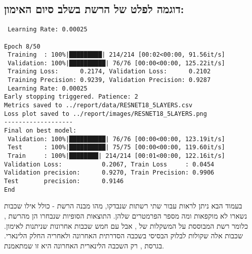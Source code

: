 \HE 
\subsection*{דוגמה לפלט של הרשת בשלב סיום האימון:}
\EN
\begin{tcolorbox}[colframe=black, colback=gray!5, boxrule=0.5mm, sharp corners]
\begin{verbatim}
 Learning Rate: 0.00025

Epoch 8/50                                                    
 Training  : 100%|█████████| 214/214 [00:02<00:00, 91.56it/s] 
 Validation: 100%|██████████| 76/76 [00:00<00:00, 125.22it/s] 
 Training Loss:      0.2174, Validation Loss:      0.2102     
 Training Precision: 0.9239, Validation Precision: 0.9287     
 Learning Rate: 0.00025                                       
Early stopping triggered. Patience: 2                         
Metrics saved to ../report/data/RESNET18_5LAYERS.csv          
Loss plot saved to ../report/images/RESNET18_5LAYERS.png      
-------------------                                           
Final on best model:                                          
 Validation: 100%|██████████| 76/76 [00:00<00:00, 123.19it/s] 
 Test      : 100%|██████████| 75/75 [00:00<00:00, 119.60it/s] 
 Train     : 100%|████████| 214/214 [00:01<00:00, 122.16it/s] 
Validation Loss:           0.2067, Train Loss     : 0.0454    
Validation precision:      0.9270, Train Precision: 0.9906    
Test       precision:      0.9146                             
End                                                           
\end{verbatim}
\end{tcolorbox}

\HE
בעמוד הבא ניתן לראות עבור שתי רשתות שנבדקו, מהו מבנה הרשת - כולל אילו שכבות נשארו לא מוקפאות ומה מספר הפרמטרים שלהן.\newline
התוצאות הסופיות שנבחרו הן מהרשת  , כלומר רשת המבוססת על המשקלות של , אבל עם חמש שכבות אחרונות שניתנות לאימון. שכבות אלה שקולות לבלוק הבסיסי בשכבה הסדרתית האחרונה ולאחריה החלק הלינארי.\newline
בגרסת , רק השכבה הלינארית האחרונה היא זו שמתאמנת.

\lstset{
    basicstyle=\ttfamily\tiny, %
    keywordstyle=\bfseries, %
    showstringspaces=false,
    breaklines=true, %
    breakatwhitespace=true, %
    breakindent=0pt, %
    columns=fullflexible, %
    frame=single, %
    numbers=none, %
    xleftmargin=10pt,
    xrightmargin=10pt,
    aboveskip=5pt, %
    belowskip=5pt, %
}

